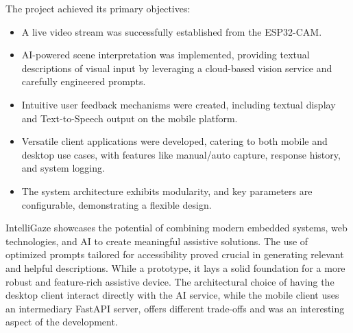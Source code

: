 \documentclass[12pt, a4paper]{report}
\begin{document}
The project achieved its primary objectives:
\begin{itemize}
    \item A live video stream was successfully established from the ESP32-CAM.
    \item AI-powered scene interpretation was implemented, providing textual descriptions of visual input by leveraging a cloud-based vision service and carefully engineered prompts.
    \item Intuitive user feedback mechanisms were created, including textual display and Text-to-Speech output on the mobile platform.
    \item Versatile client applications were developed, catering to both mobile and desktop use cases, with features like manual/auto capture, response history, and system logging.
    \item The system architecture exhibits modularity, and key parameters are configurable, demonstrating a flexible design.
\end{itemize}
IntelliGaze showcases the potential of combining modern embedded systems, web technologies, and AI to create meaningful assistive solutions. The use of optimized prompts tailored for accessibility proved crucial in generating relevant and helpful descriptions. While a prototype, it lays a solid foundation for a more robust and feature-rich assistive device. The architectural choice of having the desktop client interact directly with the AI service, while the mobile client uses an intermediary FastAPI server, offers different trade-offs and was an interesting aspect of the development.
\end{document}
